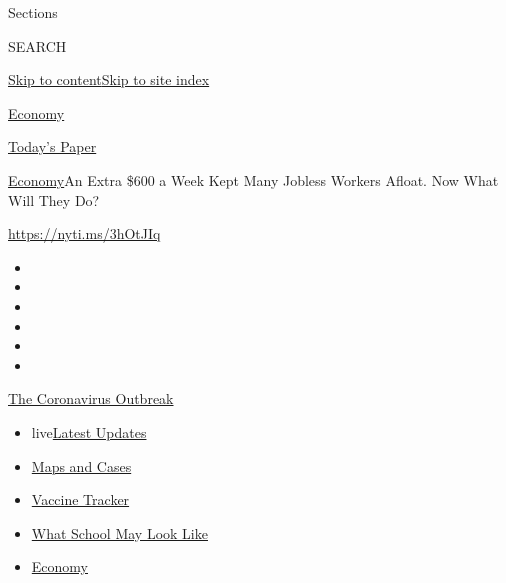 Sections

SEARCH

\protect\hyperlink{site-content}{Skip to
content}\protect\hyperlink{site-index}{Skip to site index}

\href{https://www.nytimes.com/section/business/economy}{Economy}

\href{https://myaccount.nytimes.com/auth/login?response_type=cookie\&client_id=vi}{}

\href{https://www.nytimes.com/section/todayspaper}{Today's Paper}

\href{/section/business/economy}{Economy}\textbar{}An Extra \$600 a Week
Kept Many Jobless Workers Afloat. Now What Will They Do?

\url{https://nyti.ms/3hOtJIq}

\begin{itemize}
\item
\item
\item
\item
\item
\item
\end{itemize}

\href{https://www.nytimes.com/news-event/coronavirus?action=click\&pgtype=Article\&state=default\&region=TOP_BANNER\&context=storylines_menu}{The
Coronavirus Outbreak}

\begin{itemize}
\tightlist
\item
  live\href{https://www.nytimes.com/2020/08/01/world/coronavirus-covid-19.html?action=click\&pgtype=Article\&state=default\&region=TOP_BANNER\&context=storylines_menu}{Latest
  Updates}
\item
  \href{https://www.nytimes.com/interactive/2020/us/coronavirus-us-cases.html?action=click\&pgtype=Article\&state=default\&region=TOP_BANNER\&context=storylines_menu}{Maps
  and Cases}
\item
  \href{https://www.nytimes.com/interactive/2020/science/coronavirus-vaccine-tracker.html?action=click\&pgtype=Article\&state=default\&region=TOP_BANNER\&context=storylines_menu}{Vaccine
  Tracker}
\item
  \href{https://www.nytimes.com/interactive/2020/07/29/us/schools-reopening-coronavirus.html?action=click\&pgtype=Article\&state=default\&region=TOP_BANNER\&context=storylines_menu}{What
  School May Look Like}
\item
  \href{https://www.nytimes.com/live/2020/07/31/business/stock-market-today-coronavirus?action=click\&pgtype=Article\&state=default\&region=TOP_BANNER\&context=storylines_menu}{Economy}
\end{itemize}

